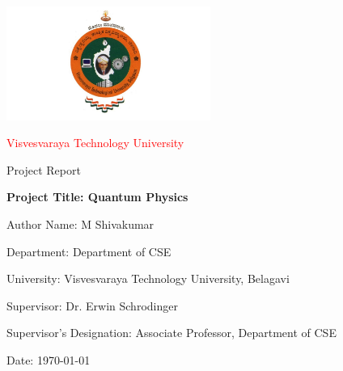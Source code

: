 \documentclass[a4paper,12pt]{report}
\begin{document}
\begin{titlepage}
\centering
\includegraphics[width=0.5\textwidth]{Vtu_Logo.jpg}\par
\vspace{1cm}
{\LARGE\textcolor{red}{Visvesvaraya Technology University}\par}
\vspace{0.5cm}
{\Huge Project Report\par}
\vspace{1.5cm}
{\Huge \bfseries Project Title: Quantum Physics\par}
\vspace{1cm}
{\Large Author Name: M Shivakumar\par}
{\Large Department: Department of CSE\par}
{\Large University: Visvesvaraya Technology University, Belagavi\par}
\vfill
{\large Supervisor: Dr. Erwin Schrodinger \par}
{\Large Supervisor's Designation: Associate Professor, Department of CSE\par}
\vspace{0.8cm}
{\Large Date: \today\par}
\end{titlepage}
\newpage
\end{document}
